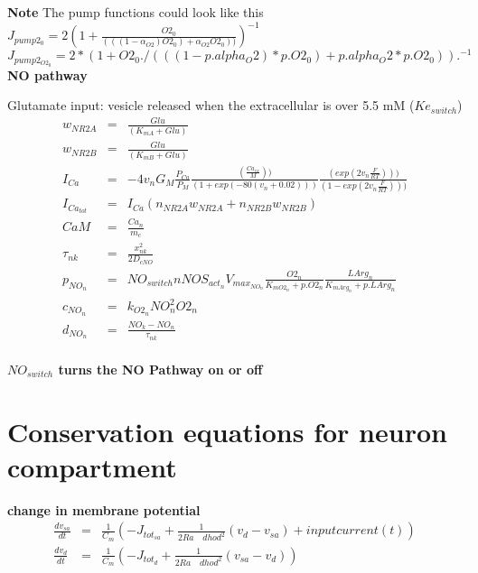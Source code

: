 \documentclass[fleqn]{report}
\numberwithin{equation}{section}
\numberwithin{equation}{section}
\newcommand{\K}{\text{K$^+$}}
\begin{document}
\textbf{Note }
The pump functions could look like this \\
$                       J_{pump2_{0}}      = 2  (1 + \frac{O2_{0}}{(((1 - \alpha_{O2}) O2_{0} ) + \alpha_{O2}  O2_0))})^{-1}$\\
 $                      J_{pump2_{O2_{0}}}  =  2 * (1 + O2_{0} ./ (((1 - p.alpha_O2) * p.O2_0) + p.alpha_O2 * p.O2_0)).^{-1}$\\
 
            
             
            \textbf{ NO pathway}
             
             Glutamate input: vesicle released when the extracellular \K is over 5.5 mM ($Ke_{switch}$) \\
             
              \begin{eqnarray}
             w_{NR2A} &=& \frac{Glu}{(K_{mA} + Glu)}\\%
             w_{NR2B} &=& \frac{Glu}{(K_{mB} + Glu)}\\%
             I_{Ca} &=& -4 v_n  G_M \frac{P_{Ca}}{P_{M}}  \frac{( \frac{Ca_{ex}}{M}))}{(1 + exp(-80 (v_n + 0.02)))} \frac{(exp(2 v_n \frac{F}{RT})))}{(1 - exp(2 v_n \frac{F}{RT})))} \\ %
             I_{Ca_{tot}} &=& I_{Ca} (n_{NR2A}  w_{NR2A} + n_{NR2B}  w_{NR2B})\\ %
%             
             CaM &=& \frac{Ca_{n}}{ m_{c}}\\ %
             \tau_{nk} &=&  \frac{x_{nk} ^ 2}{2  D_{cNO}}\\ %
%             
            p_{NO_{n}} &=& NO_{switch}   nNOS_{act_{n}} V_{max_{NO_{n}}}  \frac{O2_{n}}{K_{mO2_{n}} + p.O2_n}  \frac{LArg_{n}}{K_{mArg_{n}} + p.LArg_{n}}\\ %
             c_{NO_{n}} &=& k_{O2_{n}}  NO_{n}^2 O2_{n}\\ %
             d_{NO_{n}} &=& \frac{NO_{k} - NO_{n}}{\tau_{nk}}\\ %
              \end{eqnarray}
              
\textbf{$NO_{switch}$ turns the NO Pathway on or off}
\section{Conservation equations for neuron compartment}

%            
 \textbf{change in membrane potential}
 \begin{eqnarray}
\frac{d v_{sa}}{dt}    &=& \frac{1}{C_m} ( -J_{tot_{sa}} + \frac{1}{2 Ra\quad dhod^2}  (v_{d} - v_{sa}) + inputcurrent(t) )\\
\frac{d v_{d}}{dt}     &=& \frac{1}{C_m}(-J_{tot_{d}} + \frac{1}{2 Ra\quad dhod^2} (v_{sa} - v_{d}))\\
 \end{eqnarray}
\end{document}
